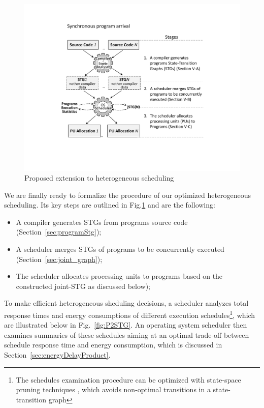 \begin{figure}
\center
\includegraphics[width=.8\columnwidth]{figs/compilerAssistedSchedulingConcept.pdf}
\caption{Proposed extension to heterogeneous scheduling}
\label{fig:compilerAssistedSchedulingConcept}
\end{figure}

We are finally ready to formalize the procedure of our optimized heterogeneous scheduling. Its key steps are outlined in Fig.\ref{fig:compilerAssistedSchedulingConcept} and are the following:

\begin{itemize}
\itemindent=26pt
\item[\emph{Step 1:}] A compiler generates STGs from programs source code (Section~\ref{sec:programStg});
\item[\emph{Step 2:}] A scheduler merges STGs of programs to be concurrently executed (Section~\ref{sec:joint_graph});
\item[\emph{Step 3:}] The scheduler allocates processing units to programs based on the constructed joint-STG as discussed below);
\end{itemize}
%
To make efficient heterogeneous sheduling decisions, a scheduler analyzes total response times and energy consumptions of different execution schedules\footnote{The schedules examination procedure can be optimized with state-space pruning techniques \cite{Burmyakov2022}, which avoids non-optimal transitions in a state-transition graph},
%
which are illustrated below in Fig.~\ref{fig:P2STG}. An operating system scheduler then examines summaries of these schedules aiming at an optimal trade-off between schedule response time and energy consumption, which is discussed in Section~\ref{sec:energyDelayProduct}. 
